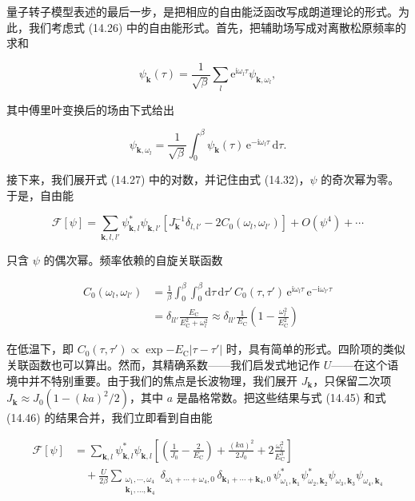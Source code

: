 量子转子模型表述的最后一步，是把相应的自由能泛函改写成朗道理论的形式。为此，我们考虑式 (14.26) 中的自由能形式。首先，把辅助场写成对离散松原频率的求和

\begin{equation*}
\psi_{\mathbf{k}}(\tau) = \frac{1}{\sqrt{\beta}} \sum_l \mathrm{e}^{\mathrm{i}\omega_l\tau} \psi_{\mathbf{k},\omega_l},\tag{14.43}
\end{equation*}

其中傅里叶变换后的场由下式给出

\begin{equation*}
\psi_{\mathbf{k},\omega_l} = \frac{1}{\sqrt{\beta}} \int_0^{\beta} \psi_{\mathbf{k}}(\tau)\, \mathrm{e}^{-\mathrm{i}\omega_l\tau}\,\mathrm{d}\tau.\tag{14.44}
\end{equation*}

接下来，我们展开式 (14.27) 中的对数，并记住由式 (14.32)，$\psi$ 的奇次幂为零。于是，自由能

\begin{equation*}
\mathcal{F}[\psi] = \sum_{\mathbf{k},l,l'} \psi_{\mathbf{k},l}^{*} \psi_{\mathbf{k},l'} \left[ J_{\mathbf{k}}^{-1} \delta_{l,l'} - 2 C_0(\omega_l, \omega_{l'}) \right] + O(\psi^4) + \cdots\tag{14.45}
\end{equation*}

只含 $\psi$ 的偶次幂。频率依赖的自旋关联函数

\begin{align*}
C_0(\omega_l, \omega_{l'}) &= \frac{1}{\beta}\int_0^{\beta}\int_0^{\beta} \mathrm{d}\tau\,\mathrm{d}\tau'\, C_0(\tau,\tau')\, \mathrm{e}^{\mathrm{i}\omega_l\tau}\, \mathrm{e}^{-\mathrm{i}\omega_{l'}\tau} \\
&= \delta_{ll'} \frac{E_{\mathrm{C}}}{E_{\mathrm{C}}^2+\omega_l^2} \approx \delta_{ll'} \frac{1}{E_{\mathrm{C}}} \left( 1 - \frac{\omega_l^2}{E_{\mathrm{C}}^2} \right)\tag{14.46}
\end{align*}

在低温下，即 $C_0(\tau,\tau')\propto\exp{-E_{\mathrm{C}}|\tau-\tau'|}$ 时，具有简单的形式。四阶项的类似关联函数也可以算出。然而，其精确系数——我们启发式地记作 $U$——在这个语境中并不特别重要。由于我们的焦点是长波物理，我们展开 $J_{\mathbf{k}}$，只保留二次项 $J_{\mathbf{k}}\approx J_0(1-(ka)^2/2)$，其中 $a$ 是晶格常数。把这些结果与式 (14.45) 和式 (14.46) 的结果合并，我们立即看到自由能

\begin{align*}
\mathcal{F}[\psi] &= \sum_{\mathbf{k},l} \psi_{\mathbf{k},l}^{*} \psi_{\mathbf{k},l} \left[ \left( \frac{1}{J_0} - \frac{2}{E_{\mathrm{C}}} \right) + \frac{(ka)^2}{2J_0} + 2\frac{\omega_l^2}{E_{\mathrm{C}}^3} \right] \\
&\quad + \frac{U}{2\beta} \sum_{\substack{\omega_1,\cdots,\omega_4 \\ \mathbf{k}_1,\ldots,\mathbf{k}_4}} \delta_{\omega_1+\cdots+\omega_4,0}\, \delta_{\mathbf{k}_1+\cdots+\mathbf{k}_4,0}\, \psi_{\omega_1,\mathbf{k}_1}^{*} \psi_{\omega_2,\mathbf{k}_2}^{*} \psi_{\omega_3,\mathbf{k}_3} \psi_{\omega_4,\mathbf{k}_4}\tag{14.47}
\end{align*}

